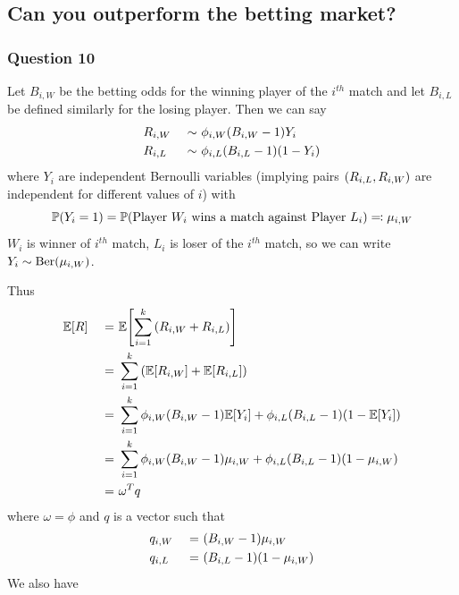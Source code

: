 \documentclass[11pt]{article} %
\let\originalleft\left
\let\originalright\right
\renewcommand{\left}{\mathopen{}\mathclose\bgroup\originalleft}
\renewcommand{\right}{\aftergroup\egroup\originalright}
\begin{document}
\subsection*{Can you outperform the betting market?}
\subsubsection*{Question 10}

Let $B_{i,W}$ be the betting odds for the winning player of the $i^{th}$ match and let $B_{i, L}$ be defined similarly for the losing player. Then we can say
\begin{alignat*}{2}
	& R_{i, W} &\ \sim\ & \phi_{i, W}\left(B_{i, W}-1\right)Y_i\\
	& R_{i, L} &\ \sim\ & \phi_{i, L}\left(B_{i, L}-1\right)\left(1-Y_i\right)
\end{alignat*}
where $Y_i$ are independent Bernoulli variables (implying pairs $\left(R_{i,L}, R_{i,W}\right)$ are independent for different values of $i$) with 
$$\mathbb{P}\left(Y_i=1\right)=\mathbb{P}\left(\text{Player }W_i\text{ wins a match against Player }L_i\right)\eqqcolon\mu_{i, W}$$
$W_i$ is winner of $i^{th}$ match, $L_i$ is loser of the $i^{th}$ match, so we can write $Y_i \sim \text{Ber}\left(\mu_{i, W}\right)$.

Thus
\begin{alignat*}{2}
	& \mathbb{E}\left[R\right] &\ =\ & \mathbb{E}\left[\sum_{i=1}^{k}{\left(R_{i, W} + R_{i, L}\right)}\right]\\
	& &\ =\ & \sum_{i=1}^{k}{\left(\mathbb{E}\left[R_{i, W}\right] + \mathbb{E}\left[R_{i, L}\right]\right)}\\
	& &\ =\ & \sum_{i=1}^{k}{\phi_{i, W}\left(B_{i, W}-1\right)\mathbb{E}\left[Y_i\right] + \phi_{i, L}\left(B_{i, L}-1\right)\left(1-\mathbb{E}\left[Y_i\right]\right)}\\
	& &\ =\ & \sum_{i=1}^{k}{\phi_{i, W}\left(B_{i, W}-1\right)\mu_{i, W} + \phi_{i, L}\left(B_{i, L}-1\right)\left(1-\mu_{i, W}\right)}\\
	& &\ =\ & \omega^T q
\end{alignat*}
where $\omega = \phi$ and $q$ is a vector such that 
\begin{alignat*}{2}
& q_{i, W} &\ =\ & \left(B_{i, W}-1\right)\mu_{i, W} \\
& q_{i, L} &\ =\ & \left(B_{i, L}-1\right)\left(1-\mu_{i, W}\right)
\end{alignat*}
We also have
\end{document}
